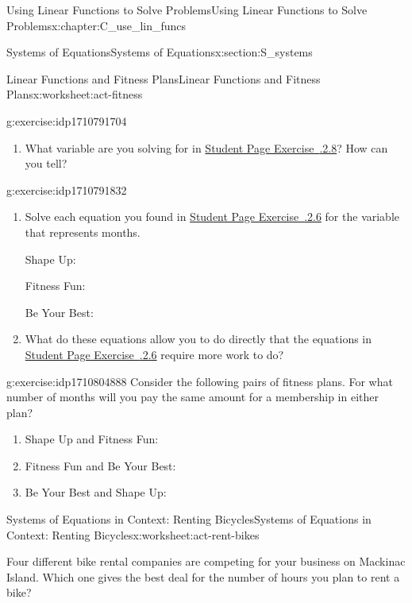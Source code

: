\documentclass[oneside,10pt,]{book}
\newcommand{\xreffont}{\relax}
\numberwithin{equation}{chapter}
\begin{document}
\begin{chapterptx}{Using Linear Functions to Solve Problems}{}{Using Linear Functions to Solve Problems}{}{}{x:chapter:C_use_lin_funcs}
\begin{sectionptx}{Systems of Equations}{}{Systems of Equations}{}{}{x:section:S_systems}
\begin{worksheet-subsection}{Linear Functions and Fitness Plans}{}{Linear Functions and Fitness Plans}{}{}{x:worksheet:act-fitness}
\begin{divisionexercise}{9}{}{}{g:exercise:idp1710791704}
\begin{enumerate}[font=\bfseries,label=(\alph*),ref=\alph*]
\item{}What variable are you solving for in \hyperlink{x:exercise:exer-fitness-summer}{Student Page Exercise~{\xreffont 3.5.2.8}}? How can you tell?%
\end{enumerate}
\end{divisionexercise}%
\begin{divisionexercise}{10}{}{}{g:exercise:idp1710791832}%
\begin{enumerate}[font=\bfseries,label=(\alph*),ref=\alph*]
\item{}Solve each equation you found in \hyperlink{x:exercise:exer-fitness-eq}{Student Page Exercise~{\xreffont 3.5.2.6}} for the variable that represents months.%
\par
Shape Up:%
\par
Fitness Fun:%
\par
Be Your Best:%
\item{}What do these equations allow you to do directly that the equations in \hyperlink{x:exercise:exer-fitness-eq}{Student Page Exercise~{\xreffont 3.5.2.6}} require more work to do?%
\end{enumerate}
\end{divisionexercise}%
\begin{divisionexercise}{11}{}{}{g:exercise:idp1710804888}%
Consider the following pairs of fitness plans. For what number of months will you pay the same amount for a membership in either plan?%
\begin{enumerate}[font=\bfseries,label=(\alph*),ref=\alph*]
\item{}Shape Up and Fitness Fun:%
\item{}Fitness Fun and Be Your Best:%
\item{}Be Your Best and Shape Up:%
\end{enumerate}
\end{divisionexercise}%
\end{worksheet-subsection}
\restoregeometry
%
%
\typeout{************************************************}
\typeout{************************************************}
%
\begin{worksheet-subsection}{Systems of Equations in Context: Renting Bicycles}{}{Systems of Equations in Context: Renting Bicycles}{}{}{x:worksheet:act-rent-bikes}
\begin{introduction}{}%
Four different bike rental companies are competing for your business on Mackinac Island. Which one gives the best deal for the number of hours you plan to rent a bike?%

\end{introduction}
\end{worksheet-subsection}
\end{sectionptx}
\end{chapterptx}
\end{document}

